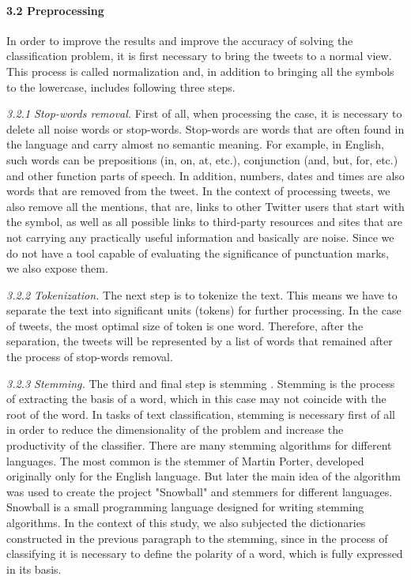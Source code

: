 \paragraph{3.2 Preprocessing}
In order to improve the results and improve the accuracy of solving the classification problem, it is first necessary to bring the tweets to a normal view. This process is called normalization and, in addition to bringing all the symbols to the lowercase, includes following three steps.

\textit{3.2.1 Stop-words removal.} First of all, when processing the case, it is necessary to delete all noise words or stop-words. Stop-words are words that are often found in the language and carry almost no semantic meaning. For example, in English, such words can be prepositions (in, on, at, etc.), conjunction (and, but, for, etc.) and other function parts of speech. In addition, numbers, dates and times are also words that are removed from the tweet. In the context of processing tweets, we also remove all the mentions, that are, links to other Twitter users that start with the \@ symbol, as well as all possible links to third-party resources and sites that are not carrying any practically useful information and basically are noise. Since we do not have a tool capable of evaluating the significance of punctuation marks, we also expose them.

\textit{3.2.2 Tokenization.} The next step is to tokenize the text. This means we have to separate the text into significant units (tokens) for further processing. In the case of tweets, the most optimal size of token is one word. Therefore, after the separation, the tweets will be represented by a list of words that remained after the process of stop-words removal.

\textit{3.2.3 Stemming.} The third and final step is stemming \cite{SavoyDolamic}. Stemming is the process of extracting the basis of a word, which in this case may not coincide with the root of the word. In tasks of text classification, stemming is necessary first of all in order to reduce the dimensionality of the problem and increase the productivity of the classifier. There are many stemming algorithms for different languages. The most common is the stemmer of Martin Porter, developed originally only for the English language. But later the main idea of the algorithm was used to create the project "Snowball" and stemmers for different languages. Snowball is a small programming language designed for writing stemming algorithms. In the context of this study, we also subjected the dictionaries constructed in the previous paragraph to the stemming, since in the process of classifying it is necessary to define the polarity of a word, which is fully expressed in its basis.

